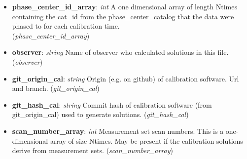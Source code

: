 \documentclass[11pt, oneside]{article}
\begin{document}
\begin{itemize}
\begin{itemize}
	\item \textbf{cat\_pm\_dec}: \textit{float} (sidereal only)
	  Proper motion in Dec in milliarcseconds per year for the source
	\item \textbf{cat\_dist}: \textit{float}
	  Distance to the source in parsec (useful if parallax is important), either a
	  single value or a one dimensional array of length Npts
	  (the number of ephemeris data points) for ephem type phase centers.
	\item \textbf{cat\_vrad}: \textit{float }
	  Radial velocity of the source in km/sec, either a single value or a
	  one dimensional array of length Npts (the number of ephemeris data points)
	  for ephem type phase centers.
	\item \textbf{info\_source}: \textit{string} Information about provenance of the source details.
	  Typically this is set either to ``file'' if it originates from a file read operation, and ``user'' if
	  it was added because of a call to the \texttt{phase()} method in \texttt{pyuvdata}. But it
	  can also be set to contain more detailed information.
	\end{itemize} (\textit{phase\_center\_catalog})
\item \textbf{phase\_center\_id\_array}: \textit{int}
A one dimensional array of length Ntimes containing the cat\_id from the phase\_center\_catalog
that the data were phased to for each calibration time. \\(\textit{phase\_center\_id\_array})

\item \textbf{observer}: \textit{string}  Name of observer who calculated solutions in this file.
  (\textit{observer})
\item \textbf{git\_origin\_cal}: \textit{string}  Origin (e.g. on github) of calibration software.
  Url and branch. (\textit{git\_origin\_cal})
\item \textbf{git\_hash\_cal}: \textit{string}  Commit hash of calibration software
  (from git\_origin\_cal) used to generate solutions.
  (\textit{git\_hash\_cal})

\item \textbf{scan\_number\_array}: \textit{int} Measurement set scan numbers.
  This is a one-dimensional array of size Ntimes.  May be present if the calibration
  solutions derive from measurement sets.
  (\textit{scan\_number\_array})

 \end{itemize}
\end{document}
